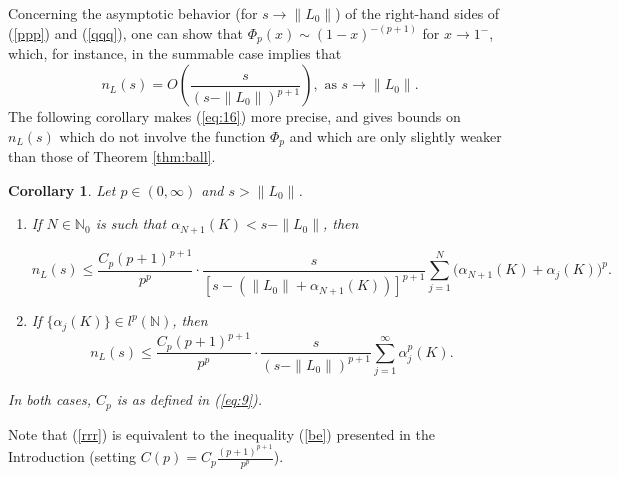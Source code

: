\documentclass[12pt,a4paper]{article}
\newtheorem {corollary}[theorem]{Corollary}
\theoremstyle{definition}
\theoremstyle{remark}
\numberwithin{equation}{section}
\newcommand{\mn}{{\mathbb N}}
\begin{document}
Concerning the asymptotic behavior (for $s \to \|L_0\|$) of the right-hand sides of (\ref{ppp}) and (\ref{qqq}), one can show that $\Phi_p(x) \sim (1-x)^{-(p+1)}$ for $x \to 1^-$, which, for instance,  in the summable case implies that  
\begin{equation}
  \label{eq:16}
  n_L(s) = O\left( \frac s {(s-\|L_0\|)^{p+1}} \right),  \text{ as } s \to \|L_0\|.
\end{equation}
The following corollary makes (\ref{eq:16}) more precise, and gives bounds on $n_L(s)$ which do not involve the function $\Phi_p$ and which are only slightly weaker than those of Theorem \ref{thm:ball}.
\begin{corollary}\label{corrr}
Let $p \in (0,\infty)$ and $s>\|L_0\|$. 
\begin{enumerate}
    \item[(i)] If $N\in\mathbb{N}_0$ is such that $\alpha_{N+1}(K)<s-\|L_0\|$, then
  \begin{small}
\begin{equation}
n_L(s) \leq \frac{C_p(p+1)^{p+1}}{p^p}\cdot \frac{s}{[s-(\|L_0\|+\alpha_{N+1}(K))]^{p+1}} \sum_{j=1}^N\Big( \alpha_{N+1}(K) + \alpha_{j}(K) \Big)^p.
  \end{equation}
  \end{small}
 \item[(ii)] If $\{\alpha_j(K)\} \in l^p(\mn)$, then
\begin{equation}\label{rrr}
n_L(s) \leq \frac{C_p(p+1)^{p+1}}{p^p}\cdot \frac{s}{(s-\|L_0\|)^{p+1}} \sum_{j=1}^\infty \alpha_j^p(K).
  \end{equation}
\end{enumerate}
In both cases, $C_p$ is as defined in (\ref{eq:9}).
\end{corollary}
 Note that (\ref{rrr}) is equivalent to the inequality (\ref{be}) presented in the Introduction (setting $C(p)=C_p\frac{(p+1)^{p+1}}{p^p}$).
\end{document}

